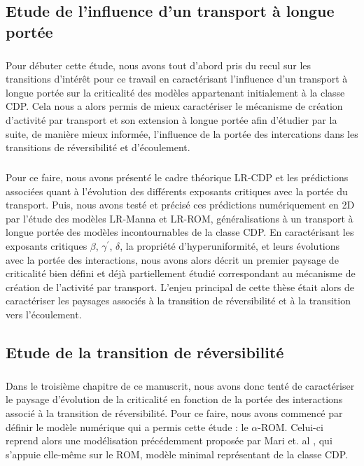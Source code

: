 \subsection*{Etude de l'influence d'un transport à longue portée}

\subparagraph{}Pour débuter cette étude, nous avons tout d'abord pris du recul sur les transitions d'intérêt pour ce travail en caractérisant l'influence d'un transport à longue portée sur la criticalité des modèles appartenant initialement à la classe CDP. Cela nous a alors permis de mieux caractériser le mécanisme de création d'activité par transport et son extension à longue portée afin d'étudier par la suite, de manière mieux informée, l'influence de la portée des intercations dans les transitions de réversibilité et d'écoulement. 

\subparagraph{}Pour ce faire, nous avons présenté le cadre théorique LR-CDP et les prédictions associées quant à l'évolution des différents exposants critiques avec la portée du transport. Puis, nous avons testé et précisé ces prédictions numériquement en 2D par l'étude des modèles LR-Manna et LR-ROM, généralisations à un transport à longue portée des modèles incontournables de la classe CDP. En caractérisant les exposants critiques $\beta$, $\gamma^\prime$, $\delta$, la propriété d'hyperuniformité, et leurs évolutions avec la portée des interactions, nous avons alors décrit un premier paysage de criticalité bien défini et déjà partiellement étudié correspondant au mécanisme de création de l'activité par transport. L'enjeu principal de cette thèse était alors de caractériser les paysages associés à la transition de réversibilité et à la transition vers l'écoulement.

\subsection*{Etude de la transition de réversibilité}

\subparagraph{}Dans le troisième chapitre de ce manuscrit, nous avons donc tenté de caractériser le paysage d'évolution de la criticalité en fonction de la portée des interactions associé à la transition de réversibilité. Pour ce faire, nous avons commencé par définir le modèle numérique qui a permis cette étude : le $\alpha$-ROM. Celui-ci reprend alors une modélisation précédemment proposée par Mari et. al \cite{mari_absorbing_2022}, qui s'appuie elle-même sur le ROM, modèle minimal représentant de la classe CDP. 

